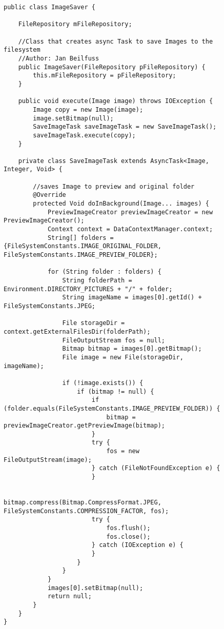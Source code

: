 \begin{figure}[H]
\begin{lstlisting}[caption=ImageSaver (Jan Beilfuß)]
public class ImageSaver {

    FileRepository mFileRepository;

    //Class that creates async Task to save Images to the filesystem
    //Author: Jan Beilfuss
    public ImageSaver(FileRepository pFileRepository) {
        this.mFileRepository = pFileRepository;
    }

    public void execute(Image image) throws IOException {
        Image copy = new Image(image);
        image.setBitmap(null);
        SaveImageTask saveImageTask = new SaveImageTask();
        saveImageTask.execute(copy);
    }

    private class SaveImageTask extends AsyncTask<Image, Integer, Void> {

        //saves Image to preview and original folder
        @Override
        protected Void doInBackground(Image... images) {
            PreviewImageCreator previewImageCreator = new PreviewImageCreator();
            Context context = DataContextManager.context;
            String[] folders = {FileSystemConstants.IMAGE_ORIGINAL_FOLDER, FileSystemConstants.IMAGE_PREVIEW_FOLDER};

            for (String folder : folders) {
                String folderPath = Environment.DIRECTORY_PICTURES + "/" + folder;
                String imageName = images[0].getId() + FileSystemConstants.JPEG;

                File storageDir = context.getExternalFilesDir(folderPath);
                FileOutputStream fos = null;
                Bitmap bitmap = images[0].getBitmap();
                File image = new File(storageDir, imageName);

                if (!image.exists()) {
                    if (bitmap != null) {
                        if (folder.equals(FileSystemConstants.IMAGE_PREVIEW_FOLDER)) {
                            bitmap = previewImageCreator.getPreviewImage(bitmap);
                        }
                        try {
                            fos = new FileOutputStream(image);
                        } catch (FileNotFoundException e) {
                        }

                        bitmap.compress(Bitmap.CompressFormat.JPEG, FileSystemConstants.COMPRESSION_FACTOR, fos);
                        try {
                            fos.flush();
                            fos.close();
                        } catch (IOException e) {
                        }
                    }
                }
            }
            images[0].setBitmap(null);
            return null;
        }
    }
}
\end{lstlisting}
\end{figure}

